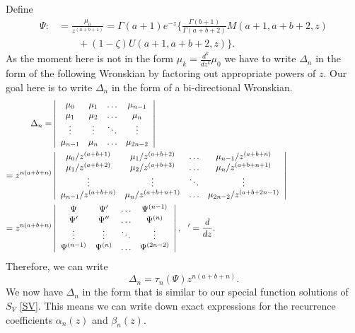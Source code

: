 \documentclass[12pt]{article}
\def\e{e^{-z}}
\numberwithin{figure}{section}
\numberwithin{equation}{section}
\numberwithin{table}{section}
\begin{document}
Define
\begin{align*}
\Psi:&=\frac{\mu_0}{z^{( a+ b+1)}}=\Gamma( a+1)\e\bigg\{\tfrac{\Gamma( b+1)}{\Gamma( a+ b+2)}M( a+1, a+ b+2,z)\\&\qquad+(1-\zeta)
U( a+1,a+ b+2,z)\bigg\}.
\end{align*}
As the moment here is not in the form $\mu_k=\frac{d^k}{dz^k}\mu_0$ we have to write $\Delta_n$ in the form of the following Wronskian by factoring out appropriate powers of $z$. Our goal here is to write $\Delta_n$ in the form of a bi-directional Wronskian.
\begin{align*}
\Delta_n=&\left|
\begin{array}{cccc}
\mu_{0} & \mu_{1}  &\hdots& \mu_{n-1} \\
\mu_{1} &\mu_{2}  &\hdots& \mu_{n}  \\
\vdots &\vdots  & \ddots &\vdots \\
\mu_{n-1} &\mu_{n}  &\hdots& \mu_{2n-2}
\end{array}
\right|\hspace{30mm}\\
=z^{n( a+ b+n)}&\left|
\begin{array}{cccc}
\mu_{0}/z^{( a+ b+1)} & \mu_{1}/z^{( a+ b+2)}  &\hdots& \mu_{n-1}/z^{( a+ b+n)} \\
\mu_{1}/z^{( a+ b+2)} &\mu_{2}/z^{( a+ b+3)}  &\hdots& \mu_{n}/z^{( a+ b+n+1)}  \\
\vdots &\vdots  & \ddots &\vdots \\
\mu_{n-1}/z^{( a+ b+n)} &\mu_{n}/z^{( a+ b+n+1)}  &\hdots& \mu_{2n-2}/z^{( a+ b+2n-1)}
\end{array}
\right|\hspace{30mm}\\
=z^{n( a+ b+n)}&\left|
\begin{array}{cccc}
\Psi & \Psi'  &\hdots& \Psi^{(n-1)} \\
\Psi' & \Psi''  &\hdots& \Psi^{(n)}  \\
\vdots &\vdots  & \ddots &\vdots \\
\Psi^{(n-1)} & \Psi^{(n)}  &\hdots& \Psi^{(2n-2)}
\end{array}\right|,~~'=\frac{d}{dz}.\\
\end{align*}
Therefore, we can write
\begin{equation}
\Delta_n=\tau_n(\Psi)z^{n( a+ b+n)}.\label{taudelta5b}
\end{equation}
We now have $\Delta_n$ in the form that is similar to our special function solutions of $S_{V}$ \eqref{SV}. This means we can write down exact expressions for the recurrence coefficients $\alpha_n(z)$ and $\beta_n(z)$.
\end{document}
